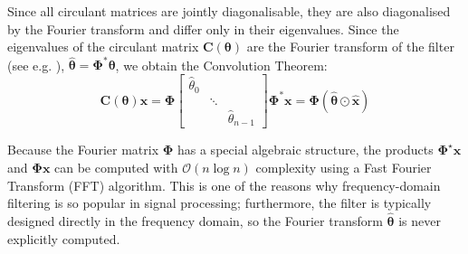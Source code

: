  
 
Since all circulant matrices are jointly diagonalisable,  
they are also diagonalised by the Fourier transform 
and differ only in their eigenvalues. Since the eigenvalues of the circulant matrix $\mathbf{C}(\boldsymbol{\theta})$ are the Fourier transform of the filter (see e.g. \cite{bamieh2018discovering}), $\hat{\boldsymbol{\theta}} = \boldsymbol{\Phi}^* \boldsymbol{\theta}$, we obtain the Convolution Theorem: 
$$
\mathbf{C}(\boldsymbol{\theta}) \mathbf{x} = \boldsymbol{\Phi}
\left[  
    \begin{array}{ccc}
    \hat{\theta}_0 &  &  \\
    & \ddots & \\
    & & \hat{\theta}_{n-1}
  \end{array}
   \right]\boldsymbol{\Phi}^*\mathbf{x}
   = \boldsymbol{\Phi} (\hat{\boldsymbol{\theta}} \odot \hat{\mathbf{x}} )
$$
%

Because the Fourier matrix $\boldsymbol{\Phi}$ has a special algebraic structure, the products $\boldsymbol{\Phi}^\star \mathbf{x}$ and $\boldsymbol{\Phi} \mathbf{x}$ can be computed with $\mathcal{O}(n \log n)$ complexity using a Fast Fourier Transform (FFT) algorithm. This is one of the reasons why frequency-domain filtering is so popular in signal processing; furthermore, the filter is typically designed directly in the frequency domain, so the Fourier transform $\hat{\boldsymbol{\theta}}$ is never explicitly computed.


